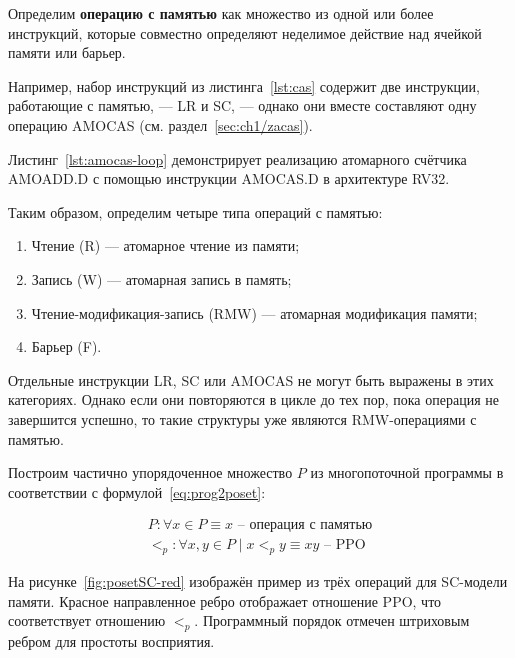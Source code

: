 \begin{definition}
  Определим \textbf{операцию с памятью} как множество из одной или
  более инструкций, которые совместно определяют неделимое действие над
  ячейкой памяти или барьер.
  \label{def:memop}
\end{definition}

Например, набор инструкций из листинга~\cref{lst:cas} содержит две
инструкции, работающие с памятью, — LR и SC, — однако они вместе
составляют одну операцию AMOCAS (см. раздел~\cref{sec:ch1/zacas}).

Листинг~\cref{lst:amocas-loop} демонстрирует реализацию атомарного
счётчика AMOADD.D с помощью инструкции AMOCAS.D в архитектуре RV32.

\begin{minipage}{\textwidth}
  \centering
  
\end{minipage}

Таким образом, определим четыре типа операций с памятью:
\begin{enumerate}
  \item Чтение (R) — атомарное чтение из памяти;
  \item Запись (W) — атомарная запись в память;
  \item Чтение-модификация-запись (RMW) — атомарная модификация памяти;
  \item Барьер (F).
\end{enumerate}

Отдельные инструкции LR, SC или AMOCAS не могут быть выражены в этих
категориях. Однако если они повторяются в цикле до тех пор, пока
операция не завершится успешно, то такие структуры уже являются
RMW-операциями с памятью.

Построим частично упорядоченное множество $P$ из многопоточной
программы в соответствии с формулой~\ref{eq:prog2poset}:

\begin{equation}
  \label{eq:prog2poset}
  \begin{multlined}
    P : \forall x \in P \equiv x \text{ -- операция с памятью} \\
    <_p : \forall x, y \in P \mid x <_p y \equiv xy \text{ -- PPO}
  \end{multlined}
\end{equation}

На рисунке~\ref{fig:posetSC-red} изображён пример из трёх операций
для SC-модели памяти. Красное направленное ребро отображает отношение
PPO, что соответствует отношению $<_p$. Программный порядок отмечен
штриховым ребром для простоты восприятия.

